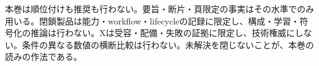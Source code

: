 \documentclass[lualatex,a4paper,10pt]{jlreq}
\begin{document}
\begin{claimboundary}[本巻の読解上の境界]
本巻は順位付けも推奨も行わない。要旨・断片・頁限定の事実はその水準でのみ用いる。閉鎖製品は能力・workflow・lifecycleの記録に限定し、構成・学習・符号化の推論は行わない。Xは受容・配備・失敗の証拠に限定し、技術権威にしない。条件の異なる数値の横断比較は行わない。未解決を閉じないことが、本巻の読みの作法である。
\end{claimboundary}


\clearpage
\onecolumn
\printbibliography[title={References}]
\end{document}
